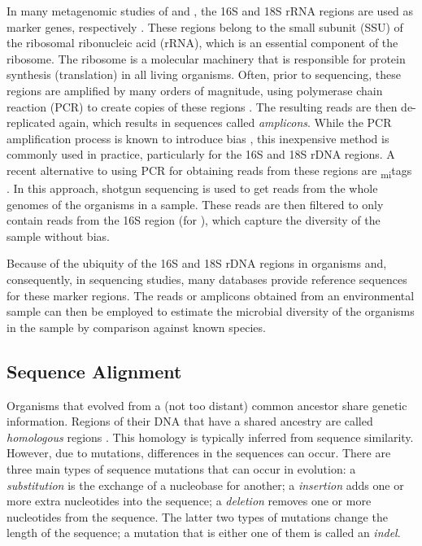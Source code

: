 In many metagenomic studies of  and ,
the 16S \cite{Weisburg1991} and 18S \cite{Meyer2010} rRNA regions are used as marker genes,
respectively \cite{Woese1977,Woese1990}.
These regions belong to the small subunit (SSU) of the ribosomal ribonucleic acid (rRNA),
which is an essential component of the ribosome.
The ribosome is a molecular machinery that is responsible for protein synthesis (translation) in all living organisms.
Often, prior to sequencing, these regions are amplified by many orders of magnitude,
using polymerase chain reaction (PCR) to create copies of these regions \cite{Bartlett2003}.
The resulting reads are then de-replicated again, which results in sequences called \emph{amplicons}.
While the PCR amplification process is known to introduce bias \cite{Logares2014,Brown2017},
this inexpensive method is commonly used in practice, particularly for the 16S and 18S rDNA regions.
A recent alternative to using PCR for obtaining reads from these regions are \textsubscript{mi}tags \citep{Logares2014}.
In this approach, shotgun sequencing is used to get reads from the whole genomes of the organisms in a sample.
These reads are then filtered to only contain reads from the 16S region (for ),
which capture the diversity of the sample without bias.

Because of the ubiquity of the 16S and 18S rDNA regions in organisms and, consequently, in sequencing studies,
many databases provide reference sequences for these marker regions.
The reads or amplicons obtained from an environmental sample can then be employed
to estimate the microbial diversity of the organisms in the sample by comparison against known species.


\subsection{Sequence Alignment}
\label{ch:Foundations:sec:SequenceAnalysis:sub:SequenceAlignment}

Organisms that evolved from a (not too distant) common ancestor share genetic information.
Regions of their DNA that have a shared ancestry are called \emph{homologous} regions \cite{Koonin2005}.
This homology is typically inferred from sequence similarity. %
However, due to mutations, differences in the sequences can occur.
There are three main types of sequence mutations that can occur in evolution:
a \emph{substitution} is the exchange of a nucleobase for another;
a \emph{insertion} adds one or more extra nucleotides into the sequence;
a \emph{deletion} removes one or more nucleotides from the sequence.
The latter two types of mutations change the length of the sequence;
a mutation that is either one of them is called an \emph{indel}.

